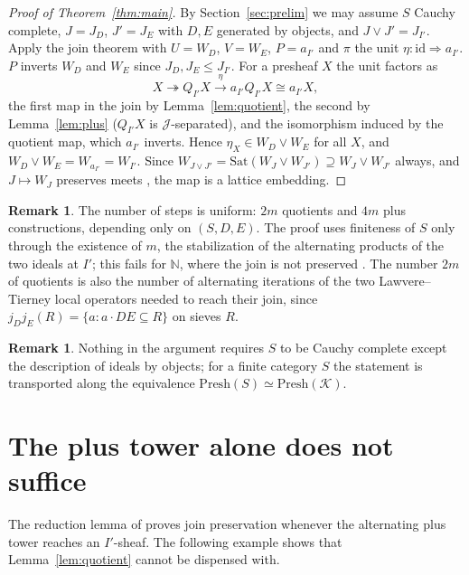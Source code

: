 \documentclass[11pt]{amsart}
\theoremstyle{definition}
\newtheorem{rem}[thm]{Remark}
\newcommand{\Presh}{\mathrm{Presh}}
\newcommand{\sJ}{\mathcal J}
\newcommand{\sK}{\mathcal K}
\begin{document}
\begin{proof}[Proof of Theorem~\ref{thm:main}]
By Section~\ref{sec:prelim} we may assume $S$ Cauchy complete, $J=J_D$,
$J'=J_E$ with $D,E$ generated by objects, and $J\vee J'=J_{I'}$. Apply the
join theorem with $U=W_D$, $V=W_E$, $P=a_{I'}$ and $\pi$ the unit
$\eta\colon\mathrm{id}\Rightarrow a_{I'}$. $P$ inverts $W_D$ and $W_E$ since
$J_D,J_E\le J_{I'}$. For a presheaf $X$ the unit factors as
\[
X\twoheadrightarrow Q_{I'}X\xrightarrow{\ \eta\ }a_{I'}Q_{I'}X\cong a_{I'}X,
\]
the first map in the join by Lemma~\ref{lem:quotient}, the second by
Lemma~\ref{lem:plus} ($Q_{I'}X$ is $\sJ$-separated), and the isomorphism
induced by the quotient map, which $a_{I'}$ inverts. Hence
$\eta_X\in W_D\vee W_E$ for all $X$, and $W_D\vee W_E=W_{a_{I'}}=W_{I'}$.
Since $W_{J\vee J'}=\mathrm{Sat}(W_J\vee W_{J'})\supseteq W_J\vee W_{J'}$
always, and $J\mapsto W_J$ preserves meets \cite[Thm.~3.1]{Topjoin}, the map
is a lattice embedding.
\end{proof}

\begin{rem}
The number of steps is uniform: $2m$ quotients and $4m$ plus constructions,
depending only on $(S,D,E)$. The proof uses finiteness of $S$ only through the
existence of $m$, the stabilization of the alternating products of the two
ideals at $I'$; this fails for $\mathbb N$, where the join is not preserved
\cite[Thm.~7.1]{Topjoin}. The number $2m$ of quotients is also the number of
alternating iterations of the two Lawvere--Tierney local operators needed to
reach their join, since $j_D j_E(R)=\{a: a\cdot DE\subseteq R\}$ on sieves $R$.
\end{rem}

\begin{rem}
Nothing in the argument requires $S$ to be Cauchy complete except the
description of ideals by objects; for a finite category $S$ the statement is
transported along the equivalence $\Presh(S)\simeq\Presh(\sK)$.
\end{rem}

\section{The plus tower alone does not suffice}\label{sec:example}

The reduction lemma of \cite{Topjoin} proves join preservation whenever the
alternating plus tower reaches an $I'$-sheaf. The following example shows that
Lemma~\ref{lem:quotient} cannot be dispensed with.
\end{document}
